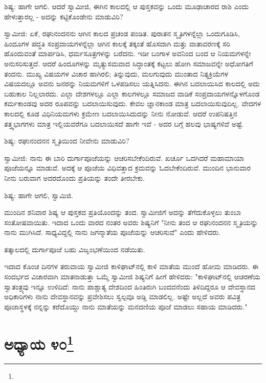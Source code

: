 ಶಿಷ್ಯ: ಹಾಗೇ ಆಗಲಿ. ಆದರೆ ಸ್ವಾಮೀಜಿ, ಈಗಿನ ಕಾಲದಲ್ಲಿ ಆ ಪುಸ್ತಕವನ್ನು ಒಂದು ಮೂಢಾಚಾರದ ರಾಶಿ ಎಂದು ಹೇಳುತ್ತಾರಲ್ಲ - ಅದನ್ನು ಕಟ್ಟಿಕೊಂಡೇನು ಮಾಡುವಿರಿ?

ಸ್ವಾಮೀಜಿ: ಏಕೆ, ರಘುನಂದನನು ಆಗಿನ ಕಾಲದ ಪ್ರಚಂಡ ಪಂಡಿತ. ಪುರಾತನ ಸ್ಮೃತಿಗಳನ್ನೆಲ್ಲಾ ಒಂದುಗೂಡಿಸಿ, ಹಿಂದೂಗಳ ಪದ್ಧತಿ ಸಂಪ್ರದಾಯಗಳನ್ನೆಲ್ಲಾ ಆಗಿನ ಕಾಲಕ್ಕೆ ತಕ್ಕಂತೆ ಹೊಸದಾಗಿ ಮತ್ತು ವಾತಾವರಣಕ್ಕೆ ಸರಿ ಹೊಂದುವಂತೆ ಮಾರ್ಪಡಿಸಿ, ಧರ್ಮಸೂತ್ರಗಳನ್ನು ಬರೆದನು. ಇಡೀ ಬಂಗಾಳ ಅವನಿಂದ ಬಂದ ಆ ನಿಯಮಗಳನ್ನೇ ಅನುಸರಿಸುತ್ತದೆ. ಆದರೆ ಹಿಂದೂಗಳನ್ನು ಮೃತ್ಯುಸಮವಾದ ಸಿದ್ಧಾಂತಕ್ಕೆ ಕಟ್ಟಲು ಹೋಗಿ ಸಮಾಜವನ್ನೇ ಅಧೋಗತಿಗೆ ತಂದನು. ಮುಖ್ಯ ವಿಷಯಗಳ ವಿಚಾರ ಹಾಗಿರಲಿ; ತಿನ್ನುವುದು, ಮಲಗುವುದು ಮುಂತಾದ ನಿತ್ಯಕ್ರಿಯೆಗಳ ವಿಷಯದಲ್ಲೂ ಅವನು ಜನರನ್ನು ನಿಯಮಗಳಿಗೆ ಒಳಪಡಿಸಲು ಯತ್ನಿಸಿದನು. ಈಗಿನ ಬದಲಾಯಿಸಿದ ಕಾಲದಲ್ಲಿ ಅದು ಬಹುಕಾಲ ನಿಲ್ಲಲಾರದು. ಎಲ್ಲಾ ದೇಶಗಳಲ್ಲೂ ಎಲ್ಲಾ ಕಾಲಗಳಲ್ಲೂ ಸಮಾಜದ ವಾಡಿಕೆ ಸಂಪ್ರದಾಯಗಳನ್ನೊಳಗೊಂಡ ಕರ್ಮಕಾಂಡವು ಅದರ ರೂಪವನ್ನು ಬದಲಾಯಿಸುವುದು. ಕೇವಲ ಜ್ಞಾನಕಾಂಡ ಮಾತ್ರ ಬದಲಾಯಿಸುವುದಿಲ್ಲ. ವೇದಗಳ ಕಾಲದಲ್ಲಿ ಕೂಡ ವಿಧಿನಿಯಮಗಳು ಕ್ರಮೇಣ ಬದಲಾಯಿಸಿದುದನ್ನು ನೀನು ನೋಡುವೆ. ಆದರೆ ಉಪನಿಷತ್ತಿನ ತತ್ತ್ವಭಾಗಗಳು ಮಾತ್ರ ಇಲ್ಲಿಯವರೆಗೂ ಬದಲಾಯಿಸದೆ ಹಾಗೇ ಇವೆ - ಅದರ ಬಗ್ಗೆ ಹಲವು ಭಾಷ್ಯಗಳಿವೆ ಅಷ್ಟೆ.

ಶಿಷ್ಯ: ರಘುನಂದನನ ಸ್ಮೃತಿಯಿಂದ ನೀವೇನು ಮಾಡುವಿರಿ?

ಸ್ವಾಮೀಜಿ: ನಾನು ಈ ಬಾರಿ ದುರ್ಗಾಪೂಜೆಯನ್ನು ಆಚರಿಸಬೇಕೆಂದಿರುವೆ. ಖರ್ಚೂ ಒದಗಿದರೆ ಮಹಾಮಾಯಾ ಪೂಜೆಯನ್ನೂ ಮಾಡುವೆ. ಅದಕ್ಕೆ ಆ ಪೂಜೆಯ ವಿಧಿವತ್ತಾದ ಕ್ರಮವನ್ನು ಓದಬೇಕೆಂದಿರುವೆ. ಮುಂದಿನ ಭಾನುವಾರ ನೀನು ಬರುವಾಗ ಅದರದೊಂದು ಪ್ರತಿಯನ್ನು ತಂದೇ ತೀರಬೇಕು.

ಶಿಷ್ಯ: ಹಾಗೇ ಆಗಲಿ, ಸ್ವಾಮಿಜಿ.

ಮುಂದಿನ ಶನಿವಾರ ಶಿಷ್ಯ ಆ ಪುಸ್ತಕದ ಪ್ರತಿಯೊಂದನ್ನು ತಂದ. ಸ್ವಾಮೀಜಿಗೆ ಅದನ್ನು ತೆಗೆದುಕೊಳ್ಳಲು ತುಂಬಾ ಸಂತೋಷವಾಯಿತು. ಇದಾದ ಒಂದು ವಾರದ ನಂತರ ಅವರು ಶಿಷ್ಯನಿಗೆ "ನೀನು ತಂದ ಆ ರಘುನಂದನನ ಸ್ಮೃತಿಯನ್ನು ನಾನು ಮುಗಿಸಿದೆ. ಸಾಧ್ಯವಿದ್ದಲ್ಲಿ ನಾನು ಜಗನ್ಮಾತೆಯ ಪೂಜೆಯನ್ನು ಆಚರಿಸುವೆ" ಎಂದು ಹೇಳಿದರು.

ತತ್ಕಾಲದಲ್ಲಿ ದುರ್ಗಾಪೂಜೆ ಬಹು ವಿಜೃಂಭಣೆಯಿಂದ ನಡೆಯಿತು.

\delimiter

ಇದಾದ ಕೊಂಚ ದಿನಗಳ ತರುವಾಯ ಸ್ವಾಮೀಜಿ ಕಾಳಿಘಾಟ್‌ನಲ್ಲಿ ಕಾಳಿ ಮಾತೆಯ ಮುಂದೆ ಹೋಮ ಮಾಡಿದರು. ಈ ಸಂದರ್ಭದ ವಿಚಾರವಾಗಿ ಮಾತನಾಡುತ್ತಾ ಒಮ್ಮೆ ಸ್ವಾಮೀಜಿ ಶಿಷ್ಯನಿಗೆ ಹೀಗೆ ಹೇಳಿದರು: "ಕಾಳಿಘಾಟ್‌ನಲ್ಲಿ ಆಚರಣೆಯ ಸ್ವಾತಂತ್ರ್ಯವು ಇನ್ನೂ ಉಳಿದಿದೆ: ನಾನು ಪಾಶ್ಚಾತ್ಯ ದೇಶದಿಂದ ಹಿಂತಿರುಗಿ ಬಂದವನೆಂದು ತಿಳಿದಿದ್ದರೂ ಆ ದೇವಸ್ಥಾನದ ಅಧಿಕಾರಿಗಳು ನಾನು ದೇವಸ್ಥಾನವನ್ನು ಪ್ರವೇಶಿಸಲು ಸ್ವಲ್ಪವೂ ಅಡ್ಡಿ ಮಾಡಲಿಲ್ಲ. ಅಷ್ಟೇ ಅಲ್ಲದೆ ಅವರು ಪವಿತ್ರ ಪೂಜಾಸ್ಥಳಕ್ಕೆ ನನ್ನನ್ನು ಕರೆದೊಯ್ದು ನಾನು ಮಾತೆಯನ್ನು ಮನದಣಿಯ ಪೂಜೆ ಮಾಡಲು ಸಹಾಯ ಮಾಡಿದರು."

\newpage

\chapter[ಅಧ್ಯಾಯ ೪೦]{ಅಧ್ಯಾಯ ೪೦\protect\footnote{}}

